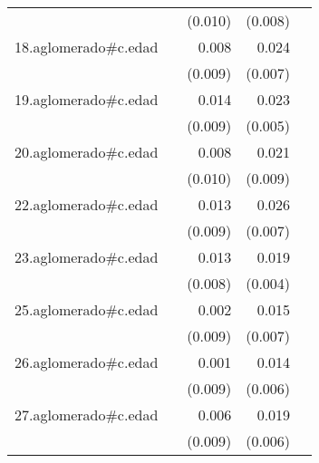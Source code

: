 {\begin{longtable}{l*{4}{D{.}{.}{-1}}}
            &                     &     (0.010)         &     (0.008)         &                     \\
\addlinespace
18.aglomerado#c.edad&                     &       0.008         &       0.024\sym{***}&                     \\
            &                     &     (0.009)         &     (0.007)         &                     \\
\addlinespace
19.aglomerado#c.edad&                     &       0.014         &       0.023\sym{***}&                     \\
            &                     &     (0.009)         &     (0.005)         &                     \\
\addlinespace
20.aglomerado#c.edad&                     &       0.008         &       0.021\sym{*}  &                     \\
            &                     &     (0.010)         &     (0.009)         &                     \\
\addlinespace
22.aglomerado#c.edad&                     &       0.013         &       0.026\sym{***}&                     \\
            &                     &     (0.009)         &     (0.007)         &                     \\
\addlinespace
23.aglomerado#c.edad&                     &       0.013         &       0.019\sym{***}&                     \\
            &                     &     (0.008)         &     (0.004)         &                     \\
\addlinespace
25.aglomerado#c.edad&                     &       0.002         &       0.015\sym{*}  &                     \\
            &                     &     (0.009)         &     (0.007)         &                     \\
\addlinespace
26.aglomerado#c.edad&                     &       0.001         &       0.014\sym{*}  &                     \\
            &                     &     (0.009)         &     (0.006)         &                     \\
\addlinespace
27.aglomerado#c.edad&                     &       0.006         &       0.019\sym{**} &                     \\
            &                     &     (0.009)         &     (0.006)         &                     \\

\end{longtable}}

